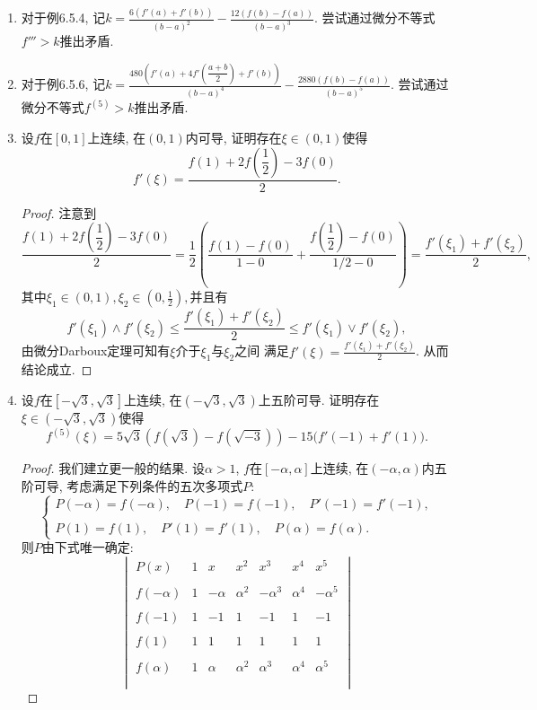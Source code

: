 \begin{5a}
\begin{enumerate}
\begin{proof}[解答]
\end{proof}
\item 对于例6.5.4, 记\(k=\frac{6(f'(a)+f'(b))}{(b-a)^2}-\frac{12(f(b)-f(a))}{(b-a)^3}\). 尝试通过微分不等式\(f'''>k\)推出矛盾.
\item 对于例6.5.6, 记\(k=\frac{480(f'(a)+4f'\left(\dfrac{a+b}{2}\right)+f'(b))}{(b-a)^4}-\frac{2880(f(b)-f(a))}{(b-a)^5}\). 尝试通过微分不等式\(f^{(5)}>k\)推出矛盾.
\item 设\(f\)在\([0,1]\)上连续, 在\((0,1)\)内可导, 证明存在\(\xi\in(0,1)\)使得
\[f'(\xi)=\frac{f(1)+2f\left(\dfrac{1}{2}\right)-3f(0)}{2}.\]
\begin{proof}
注意到\[\frac{f(1)+2f\left(\dfrac{1}{2}\right)-3f(0)}{2}
=\frac{1}{2}\left(\frac{f(1)-f(0)}{1-0}+\frac{f\left(\dfrac{1}{2}\right)-f(0)}{1/2-0}\right)
=\frac{f'(\xi_1)+f'(\xi_2)}{2},\]
其中\(\xi_1\in(0,1),\xi_2\in\left(0,\frac{1}{2}\right),\)并且有
\[f'(\xi_1)\wedge f'(\xi_2)\leqslant\frac{f'(\xi_1)+f'(\xi_2)}{2}
\leqslant f'(\xi_1)\vee f'(\xi_2),\]
由微分Darboux定理可知有\(\xi\)介于\(\xi_1\)与\(\xi_2\)之间
满足\(f'(\xi)=\frac{f'(\xi_1)+f'(\xi_2)}{2}\). 从而结论成立.
\end{proof}
\item 设\(f\)在\([-\sqrt{3},\sqrt{3}]\)上连续, 在\((-\sqrt{3},\sqrt{3})\)上五阶可导. 
证明存在\(\xi \in (-\sqrt{3},\sqrt{3})\)使得
\[f^{(5)}(\xi)=5\sqrt{3}\left(f(\sqrt{3})-f(\sqrt{-3})\right)-15\big(f'(-1)+f'(1)\big).\]
\begin{proof}
我们建立更一般的结果. 设\(\alpha>1\), \(f\)在\([-\alpha,\alpha]\)上连续, 
在\((-\alpha,\alpha)\)内五阶可导, 考虑满足下列条件的五次多项式\(P\):
\[\begin{cases}
P(-\alpha)=f(-\alpha),\quad P(-1)=f(-1),\quad P'(-1)=f'(-1),\\ \\
P(1)=f(1),\quad P'(1)=f'(1),\quad P(\alpha)=f(\alpha).
\end{cases}\]则\(P\)由下式唯一确定:\[\begin{vmatrix}
P(x)&1&x&x^2&x^3&x^4&x^5\\ \\
f(-\alpha)&1&-\alpha&\alpha^2&-\alpha^3&\alpha^4&-\alpha^5\\ \\
f(-1)&1&-1&1&-1&1&-1\\ \\
f(1)&1&1&1&1&1&1\\ \\
f(\alpha)&1&\alpha&\alpha^2&\alpha^3&\alpha^4&\alpha^5\\ \\

\end{vmatrix}\]
\end{proof}
\end{enumerate}
\end{5a}

